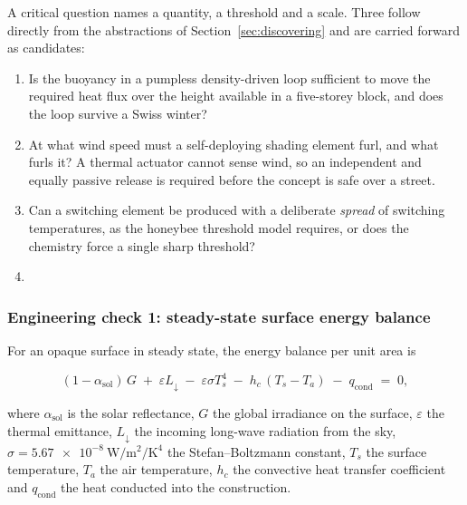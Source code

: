 A critical question names a quantity, a threshold and a scale. Three follow
directly from the abstractions of Section~\ref{sec:discovering} and are carried
forward as candidates:

\begin{enumerate}
  \item Is the buoyancy in a pumpless density-driven loop sufficient to move the
        required heat flux over the height available in a five-storey block, and
        does the loop survive a Swiss winter?
  \item At what wind speed must a self-deploying shading element furl, and what
        furls it? A thermal actuator cannot sense wind, so an independent and
        equally passive release is required before the concept is safe over a
        street.
  \item Can a switching element be produced with a deliberate \emph{spread} of
        switching temperatures, as the honeybee threshold model requires, or does
        the chemistry force a single sharp threshold?
  \item {}
\end{enumerate}

\subsubsection{Engineering check 1: steady-state surface energy balance}


For an opaque surface in steady state, the energy balance per unit area is

\begin{equation}
(1-\alpha_\mathrm{sol})\,G \;+\; \varepsilon L_\downarrow
\;-\; \varepsilon \sigma T_s^{4} \;-\; h_c\,(T_s - T_a) \;-\; q_\mathrm{cond}
\;=\; 0 ,
\label{eq:energybalance}
\end{equation}

\noindent where $\alpha_\mathrm{sol}$ is the solar reflectance,
$G$ the global irradiance on the surface, $\varepsilon$ the thermal emittance,
$L_\downarrow$ the incoming long-wave radiation from the sky,
$\sigma = \qty{5.67e-8}{\watt\per\square\metre\per\kelvin\tothe{4}}$ the
Stefan--Boltzmann constant, $T_s$ the surface temperature, $T_a$ the air
temperature, $h_c$ the convective heat transfer coefficient and
$q_\mathrm{cond}$ the heat conducted into the construction.

